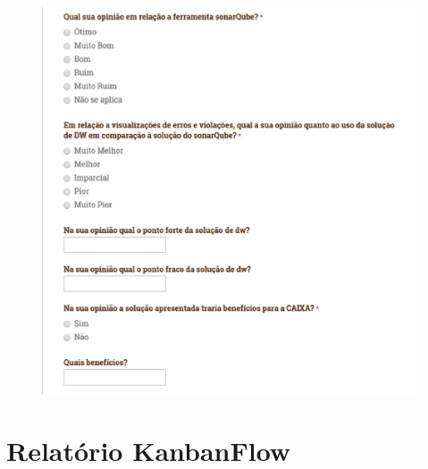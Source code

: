 \begin{apendicesenv}
\begin{figure}[h!]
\centering
\includegraphics[keepaspectratio=false,scale=0.50]{figuras/figuras_nilton/questionario4.eps}
\label{questionario4}
\end{figure}

\chapter{Relatório KanbanFlow}
\label{sec:kanban}


\end{apendicesenv}
